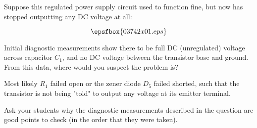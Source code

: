 

Suppose this regulated power supply circuit used to function fine, but now has stopped outputting any DC voltage at all:

$$\epsfbox{03742x01.eps}$$

Initial diagnostic measurements show there to be full DC (unregulated) voltage across capacitor $C_1$, and no DC voltage between the transistor base and ground.  From this data, where would you suspect the problem is?







Most likely $R_1$ failed open or the zener diode $D_5$ failed shorted, such that the transistor is not being "told" to output any voltage at its emitter terminal.







Ask your students why the diagnostic measurements described in the question are good points to check (in the order that they were taken).




